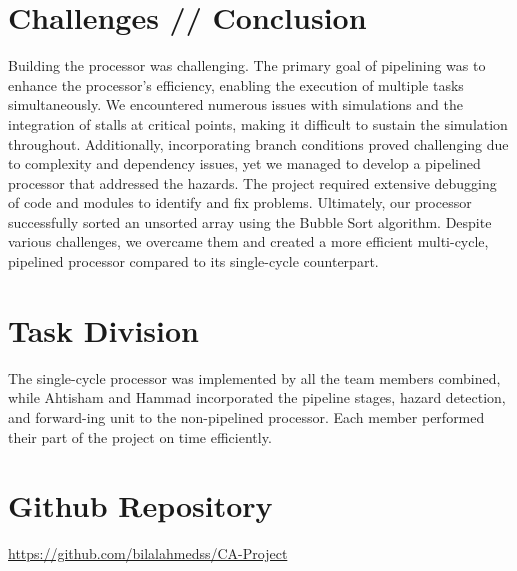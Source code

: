 \documentclass{article}
\begin{document}
\section{Challenges // Conclusion}
Building the processor was challenging. The primary goal of pipelining was to enhance the processor's efficiency, enabling the execution of multiple tasks simultaneously. We encountered numerous issues with simulations and the integration of stalls at critical points, making it difficult to sustain the simulation throughout. Additionally, incorporating branch conditions proved challenging due to complexity and dependency issues, yet we managed to develop a pipelined processor that addressed the hazards. The project required extensive debugging of code and modules to identify and fix problems. Ultimately, our processor successfully sorted an unsorted array using the Bubble Sort algorithm. Despite various challenges, we overcame them and created a more efficient multi-cycle, pipelined processor compared to its single-cycle counterpart.


\section{Task Division}
The single-cycle processor was implemented by all the team members combined, while Ahtisham and Hammad incorporated the pipeline stages, hazard detection, and forward-ing unit to the non-pipelined processor. Each member performed their part of the project on time efficiently.
\section{Github Repository}
\href{https://github.com/bilalahmedss/CA-Project}{https://github.com/bilalahmedss/CA-Project}
\end{document}
